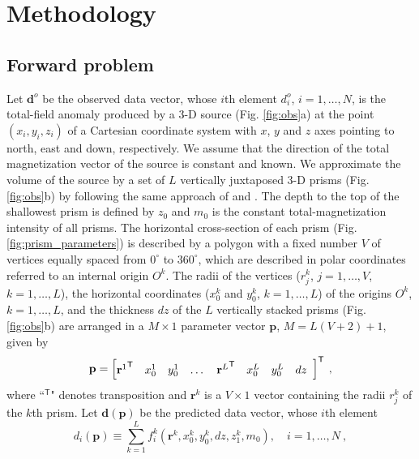 \section{Methodology}\label{sec:metodo}

\subsection{Forward problem}

Let $\mathbf{d}^{o}$ be the observed data vector, whose $i$th element $d^{o}_{i}$, $i = 1, \dots, N$, is the total-field anomaly produced by a 3-D source (Fig. \ref{fig:obs}a) at the point $(x_{i}, y_{i}, z_{i})$ of a Cartesian coordinate  system with $x$, $y$ and $z$ axes pointing to north, east and down, respectively. We assume that the direction of the total magnetization vector of the source is constant and known. We approximate the volume of the source by a set of $L$ vertically juxtaposed 3-D prisms (Fig. \ref{fig:obs}b) by following the same approach of \cite{oliveirajr-etal2011} and \cite{oliveirajr-barbosa2013}. The depth to the top of the shallowest prism is defined by $z_{0}$ and $m_{0}$ is the constant total-magnetization  intensity of all prisms. The horizontal cross-section of each prism (Fig. \ref{fig:prism_parameters}) 
is described by a polygon with a fixed number $V$ of vertices equally spaced from $0^{\circ}$ to $360^{\circ}$, which are described in polar coordinates referred to an internal origin $O^{k}$. The radii of the vertices ($r^{k}_{j}$, $j=1,\dots , V$, $k=1,\dots ,L$), the horizontal coordinates ($x_{0}^{k}$ and $y_{0}^{k}$, $k=1,\dots ,L$) of the origins $O^{k}$, $k=1,\dots ,L$, and the thickness $dz$ of the $L$ vertically stacked prisms (Fig. \ref{fig:obs}b) are arranged in a $M \times 1$ parameter vector $\mathbf{p}$, $M = L (V + 2) + 1$, given by
\begin{equation}
\mathbf{p} = \left[ \begin{array}{@{}*{12}{c}@{}}
{\mathbf{r}^{1}}^{\mathsf{T}} & x_{0}^{1} & y_{0}^{1} & \dots & {\mathbf{r}^{L}}^{\mathsf{T}} & x_{0}^{L} & y_{0}^{L} & dz \\
\end{array} \right]^{\mathsf{T}} \: ,
\label{eq:p-vector}
\end{equation}
where ``$^{\mathsf{T}}$" denotes transposition and $\mathbf{r}^{k}$ is a $V \times 1$ vector containing the radii $r^{k}_{j}$ 
of the $k$th prism.
Let $\mathbf{d} (\mathbf{p})$ be the predicted data vector, whose $i$th element 
\begin{equation}
d_{i} (\mathbf{p}) \equiv \sum\limits_{k=1}^{L} f_{i}^{k}(\mathbf{r}^{k}, x_{0}^{k}, y_{0}^{k}, dz, z_{1}^{k}, m_{0}), \quad i = 1, \dots, N \: ,
\label{eq:predicted-data-i}
\end{equation}
